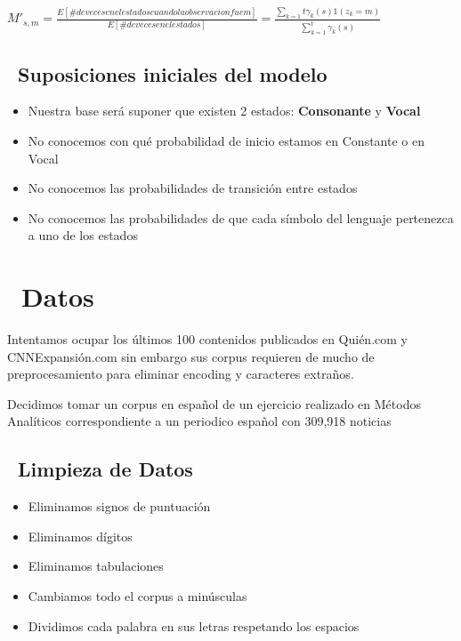 \documentclass[]{article}
\begin{document}
\(M'_{s,m}=\frac{E[\# de veces en el estado s cuando la observacion fue m]}{E[\# de veces en el estado s]}=\frac{\sum_{k=1}{t}\gamma_{k}(s)1(z_{k}=m)}{\sum_{k=1}^{t}\gamma_{k}(s)}\)

\subsection{~Suposiciones iniciales del
modelo}\label{suposiciones-iniciales-del-modelo}

\begin{itemize}
\itemsep1pt\parskip0pt
\item
  Nuestra base será suponer que existen 2 estados: \textbf{Consonante} y
  \textbf{Vocal}\\
\item
  No conocemos con qué probabilidad de inicio estamos en Constante o en
  Vocal
\item
  No conocemos las probabilidades de transición entre estados
\item
  No conocemos las probabilidades de que cada símbolo del lenguaje
  pertenezca a uno de los estados
\end{itemize}

\section{~Datos}\label{datos}

Intentamos ocupar los últimos 100 contenidos publicados en Quién.com y
CNNExpansión.com sin embargo sus corpus requieren de mucho de
preprocesamiento para eliminar encoding y caracteres extraños.

Decidimos tomar un corpus en español de un ejercicio realizado en
Métodos Analíticos correspondiente a un periodico español con 309,918
noticias

\subsection{~Limpieza de Datos}\label{limpieza-de-datos}

\begin{itemize}
\itemsep1pt\parskip0pt
\item
  Eliminamos signos de puntuación
\item
  Eliminamos dígitos
\item
  Eliminamos tabulaciones
\item
  Cambiamos todo el corpus a minúsculas
\item
  Dividimos cada palabra en sus letras respetando los espacios
\end{itemize}
\end{document}
